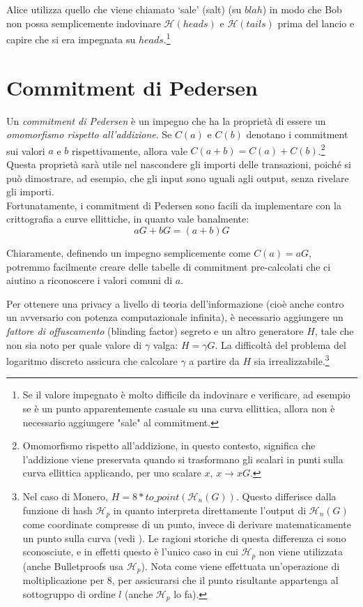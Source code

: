 Alice utilizza quello che viene chiamato `sale' (salt) (su $blah$) in modo che Bob non possa semplicemente indovinare $\mathcal{H}(heads)$ e $\mathcal{H}(tails)$ prima del lancio e capire che si era impegnata su $heads$.\footnote{Se il valore impegnato è molto difficile da indovinare e verificare, ad esempio se è un punto apparentemente casuale su una curva ellittica, allora non è necessario aggiungere "sale" al commitment.}



\section{Commitment di Pedersen}
\label{pedersen_section}

Un {\em commitment di Pedersen} \cite{Pedersen1992} è un impegno che ha la proprietà di essere un {\em omomorfismo rispetto all'addizione}. Se \(C(a)\) e \(C(b)\) denotano i commitment sui valori \(a\) e \(b\) rispettivamente, allora vale \(C(a + b) = C(a) + C(b)\).\footnote{Omomorfismo rispetto all'addizione, in questo contesto, significa che l'addizione viene preservata quando si trasformano gli scalari in punti sulla curva ellittica applicando, per uno scalare $x$, $x \rightarrow x G$.} Questa proprietà sarà utile nel nascondere gli importi delle transazioni, poiché si può dimostrare, ad esempio, che gli input sono uguali agli output, senza rivelare gli importi.
\\

Fortunatamente, i commitment di Pedersen sono facili da implementare con la crittografia a curve ellittiche, in quanto vale banalmente: \[a G + b G = (a + b) G\]

Chiaramente, definendo un impegno semplicemente come \(C(a) = a G\), potremmo facilmente creare delle tabelle di commitment pre-calcolati che ci aiutino a riconoscere i valori comuni di $a$.

Per ottenere una privacy a livello di teoria dell'informazione (cioè anche contro un avversario con potenza computazionale infinita), è necessario aggiungere un {\em fattore di offuscamento} (blinding factor) segreto e un altro generatore \(H\), tale che non sia noto per quale valore di \(\gamma\) valga: \(H = \gamma G\). La difficoltà del problema del logaritmo discreto assicura che calcolare $\gamma$ a partire da $H$ sia irrealizzabile.\footnote{Nel caso di Monero, $H = 8*to\_point(\mathcal{H}_n(G))$. Questo differisce dalla funzione di hash $\mathcal{H}_p$ in quanto interpreta direttamente l’output di $\mathcal{H}_n(G)$ come coordinate compresse di un punto, invece di derivare matematicamente un punto sulla curva (vedi \cite{hashtopoint-writeup}). Le ragioni storiche di questa differenza ci sono sconosciute, e in effetti questo è l’unico caso in cui $\mathcal{H}_p$ non viene utilizzata (anche Bulletproofs usa $\mathcal{H}_p$). Nota come viene effettuata un’operazione di moltiplicazione per $8$, per assicurarsi che il punto risultante appartenga al sottogruppo di ordine $l$ (anche $\mathcal{H}_p$ lo fa).}


